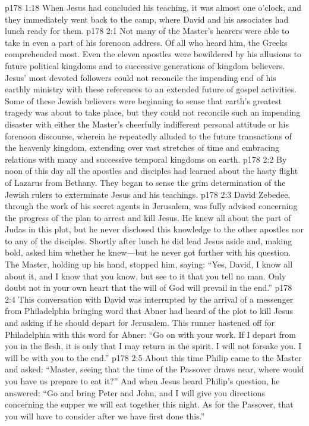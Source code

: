 \pc \vs p178 1:18 When Jesus had concluded his teaching, it was almost one o’clock, and they immediately went back to the camp, where David and his associates had lunch ready for them.
\vs p178 2:1 Not many of the Master’s hearers were able to take in even a part of his forenoon address. Of all who heard him, the Greeks comprehended most. Even the eleven apostles were bewildered by his allusions to future political kingdoms and to successive generations of kingdom believers. Jesus’ most devoted followers could not reconcile the impending end of his earthly ministry with these references to an extended future of gospel activities. Some of these Jewish believers were beginning to sense that earth’s greatest tragedy was about to take place, but they could not reconcile such an impending disaster with either the Master’s cheerfully indifferent personal attitude or his forenoon discourse, wherein he repeatedly alluded to the future transactions of the heavenly kingdom, extending over vast stretches of time and embracing relations with many and successive temporal kingdoms on earth.
\vs p178 2:2 By noon of this day all the apostles and disciples had learned about the hasty flight of Lazarus from Bethany. They began to sense the grim determination of the Jewish rulers to exterminate Jesus and his teachings.
\vs p178 2:3 David Zebedee, through the work of his secret agents in Jerusalem, was fully advised concerning the progress of the plan to arrest and kill Jesus. He knew all about the part of Judas in this plot, but he never disclosed this knowledge to the other apostles nor to any of the disciples. Shortly after lunch he did lead Jesus aside and, making bold, asked him whether he knew---but he never got further with his question. The Master, holding up his hand, stopped him, saying: \textcolor{ubdarkred}{“Yes, David, I know all about it, and I know that you know, but see to it that you tell no man. Only doubt not in your own heart that the will of God will prevail in the end.”}
\vs p178 2:4 This conversation with David was interrupted by the arrival of a messenger from Philadelphia bringing word that Abner had heard of the plot to kill Jesus and asking if he should depart for Jerusalem. This runner hastened off for Philadelphia with this word for Abner: \textcolor{ubdarkred}{“Go on with your work. If I depart from you in the flesh, it is only that I may return in the spirit. I will not forsake you. I will be with you to the end.”}
\vs p178 2:5 About this time Philip came to the Master and asked: “Master, seeing that the time of the Passover draws near, where would you have us prepare to eat it?” And when Jesus heard Philip’s question, he answered: \textcolor{ubdarkred}{“Go and bring Peter and John, and I will give you directions concerning the supper we will eat together this night. As for the Passover, that you will have to consider after we have first done this.”}
